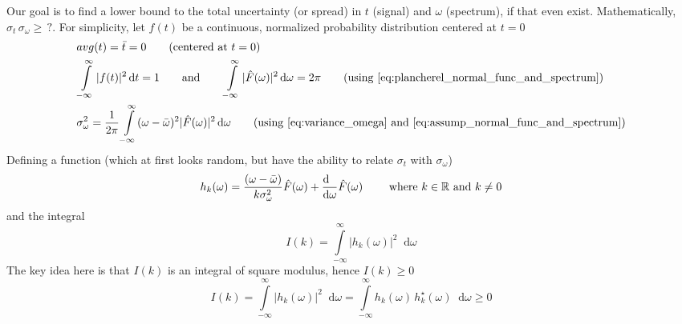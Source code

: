 \documentclass[11pt, a4paper]{article}
\newcommand{\eqrefnp}[1]{\textup{\ref{#1}}}
\newcommand{\variance}[1]{\sigma_{#1}^{2}}
\newcommand{\stdev}[1]{\sigma_{#1}}
\newcommand{\diff}{\mathop{}\!\mathrm{d}}
\newcommand{\dt}{\diff t}
\newcommand{\domega}{\diff \omega}
\newcommand{\derv}[1]{\frac{\diff \hfill}{\diff #1}}	%
\newcommand{\dint}[2]{\int \limits_{#1}^{#2}}  %
\newcommand{\intinfty}{\dint{-\infty}{\infty}}	%
\begin{document}
\vspace{4pt}
Our goal is to find a lower bound to the total uncertainty (or spread) in $t$ (signal) and $\omega$ (spectrum), if that even exist. Mathematically, $\stdev{t}\, \stdev{\omega} \geq \, ?$. For simplicity, let $f(t)$ be a continuous, 
normalized probability distribution centered at $t=0$
\begin{subequations}
	\begin{align}
		& avg(t) = \bar{t} = 0 \qquad \text{(centered at $t = 0$)} \label{eq:assump_avg_t_0} \\
		& \intinfty |f(t)|^{2} \dt = 1 \qquad \text{and} \qquad \intinfty |\hat{F}(\omega)|^{2} \domega = 2\pi \qquad \text{(using \eqrefnp{eq:plancherel_normal_func_and_spectrum})} \label{eq:assump_normal_func_and_spectrum} \\
		& \variance{\omega} = \frac{1}{2\pi} \intinfty (\omega - \bar{\omega})^{2} |\hat{F}(\omega)|^{2} \domega  \qquad \text{(using \eqrefnp{eq:variance_omega} and \eqrefnp{eq:assump_normal_func_and_spectrum})} \label{eq:assump_variance_omega}
	\end{align}
\end{subequations}
Defining a function (which at first looks random, but have the ability to relate $\stdev{t}$ with $\stdev{\omega}$)\cite{dubey2021fourieruncertainity}
\begin{equation}\label{eq:uncertainity_main_functionl}
	h_{k}(\omega) = \frac{(\omega - \bar{\omega})}{k \variance{\omega}} \hat{F}(\omega) + \derv{\omega}\hat{F}(\omega) \qquad \text{ where } k \in \mathbb{R} \text{ and } k \neq 0
\end{equation}
and the integral 
\begin{equation}\label{eq:uncertainity_main_integral}
	I(k) = \intinfty |h_{k}(\omega)|^2 \domega
\end{equation}
The key idea here is that $I(k)$ is an integral of square modulus, hence $I(k) \geq 0$
\begin{equation}\label{eq:uncertainity_main_integral_geq_0}
	I(k) = \intinfty |h_{k}(\omega)|^2 \domega = \intinfty h_{k}(\omega) \, h_{k}^{\star}(\omega) \domega \geq 0
\end{equation}
\end{document}
